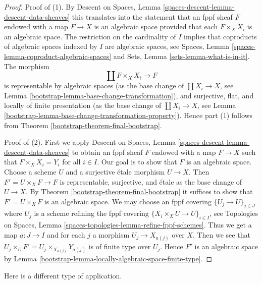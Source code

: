 \begin{proof}

Proof of (1). By
Descent on Spaces, Lemma \ref{spaces-descent-lemma-descent-data-sheaves}
this translates into the statement that an fppf sheaf $F$
endowed with a map $F \to X$ is an algebraic space provided that
each $F \times_X X_i$ is an algebraic space.
The restriction on the cardinality of $I$ implies that
coproducts of algebraic spaces indexed by $I$ are algebraic spaces, see
Spaces, Lemma \ref{spaces-lemma-coproduct-algebraic-spaces}
and
Sets, Lemma \ref{sets-lemma-what-is-in-it}.
The morphism
$$
\coprod F \times_X X_i \longrightarrow F
$$
is representable by algebraic spaces (as the base change of
$\coprod X_i \to X$, see Lemma \ref{bootstrap-lemma-base-change-transformation}),
and surjective, flat, and locally of finite presentation
(as the base change of $\coprod X_i \to X$, see
Lemma \ref{bootstrap-lemma-base-change-transformation-property}).
Hence part (1) follows from Theorem \ref{bootstrap-theorem-final-bootstrap}.

\medskip\noindent
Proof of (2). First we apply
Descent on Spaces, Lemma \ref{spaces-descent-lemma-descent-data-sheaves}
to obtain an fppf sheaf $F$ endowed with a map $F \to X$
such that $F \times_X X_i = Y_i$ for all $i \in I$.
Our goal is to show that $F$ is an algebraic space.
Choose a scheme $U$ and a surjective \'etale morphism $U \to X$.
Then $F' = U \times_X F \to F$ is representable, surjective, and \'etale
as the base change of $U \to X$.
By Theorem \ref{bootstrap-theorem-final-bootstrap} it suffices to show
that $F' = U \times_X F$ is an algebraic space.
We may choose an fppf covering $\{U_j \to U\}_{j \in J}$
where $U_j$ is a scheme refining the fppf covering
$\{X_i \times_X U \to U\}_{i \in I}$, see
Topologies on Spaces, Lemma
\ref{spaces-topologies-lemma-refine-fppf-schemes}.
Thus we get a map $a : J \to I$ and for each $j$
a morphism $U_j \to X_{a(j)}$ over $X$.
Then we see that $U_j \times_U F' = U_j \times_{X_{a(j)}} Y_{a(j)}$
is of finite type over $U_j$. Hence $F'$ is an algebraic
space by Lemma \ref{bootstrap-lemma-locally-algebraic-space-finite-type}.
\end{proof}

Here is a different type of application.

